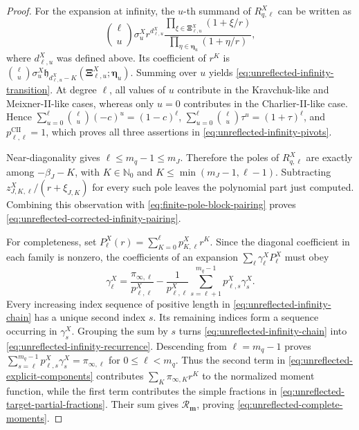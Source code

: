 \documentclass[10pt]{amsart}
\newcommand{\Nzero}{\mathbb N_0}
\newcommand{\mm}{\boldsymbol m}
\theoremstyle{plain}
\theoremstyle{definition}
\theoremstyle{remark}
\begin{document}
\begin{proof}
For the expansion at infinity, the \(u\)-th summand of
\(R_{q,\ell}^X\) can be written as
\[
 \binom\ell u\sigma_u^X
 r^{d_{\ell,u}^X}
 \frac{\prod_{\xi\in\boldsymbol\Xi_{\ell,u}^X}(1+\xi/r)}
      {\prod_{\eta\in\boldsymbol\eta_u}(1+\eta/r)},
\]
where \(d_{\ell,u}^X\) was defined above. Its coefficient of \(r^K\) is
\(\binom\ell u\sigma_u^X
\mathfrak h_{d_{\ell,u}^X-K}
(\boldsymbol\Xi_{\ell,u}^X;\boldsymbol\eta_u)\).
Summing over \(u\) yields
\eqref{eq:unreflected-infinity-transition}.  At degree \(\ell\), all
values of \(u\) contribute in the Kravchuk-like and Meixner-II-like cases, whereas
only \(u=0\) contributes in the Charlier-II-like case. Hence
\(\sum_{u=0}^{\ell}\binom\ell u(-c)^u=(1-c)^\ell\),
\(\sum_{u=0}^{\ell}\binom\ell u\tau^u=(1+\tau)^\ell\), and
\(p_{\ell,\ell}^{\mathrm{CII}}=1\),
which proves all three assertions in
\eqref{eq:unreflected-infinity-pivots}.

Near-diagonality gives \(\ell\le m_q-1\le m_J\).  Therefore the poles
of \(R_{q,\ell}^X\) are exactly among
\(-\beta_J-K\), with
\(K\in\Nzero\) and \(K\le\min(m_J-1,\ell-1)\). Subtracting
\(z_{J,K,\ell}^X/(r+\xi_{J,K})\) for every such pole leaves the
polynomial part just computed.  Combining this observation with
\eqref{eq:finite-pole-block-pairing} proves
\eqref{eq:unreflected-corrected-infinity-pairing}.

For completeness, set
\(P_\ell^X(r)=\sum_{K=0}^{\ell}p_{K,\ell}^Xr^K\).  Since the diagonal
coefficient in each family is nonzero, the coefficients of an expansion
\(\sum_\ell\gamma_\ell^XP_\ell^X\) must obey
\begin{equation}
 \gamma_\ell^X
 =\frac{\pi_{\infty,\ell}}{p_{\ell,\ell}^X}
 -\frac1{p_{\ell,\ell}^X}
  \sum_{s=\ell+1}^{m_q-1}p_{\ell,s}^X\gamma_s^X.
 \label{eq:unreflected-infinity-recurrence}
\end{equation}
Every increasing index sequence of positive length in
\eqref{eq:unreflected-infinity-chain} has a unique second index \(s\).
Its remaining indices form a sequence occurring in \(\gamma_s^X\).
Grouping the sum by \(s\) turns
\eqref{eq:unreflected-infinity-chain} into
\eqref{eq:unreflected-infinity-recurrence}. Descending from
\(\ell=m_q-1\) proves
\(\sum_{s=\ell}^{m_q-1}p_{\ell,s}^X\gamma_s^X
=\pi_{\infty,\ell}\) for \(0\le\ell<m_q\).
Thus the second term in
\eqref{eq:unreflected-explicit-components} contributes
\(\sum_K\pi_{\infty,K}r^K\) to the normalized moment function, while the
first term contributes the simple fractions in
\eqref{eq:unreflected-target-partial-fractions}. Their sum gives
\(\mathcal R_{\mm}\), proving
\eqref{eq:unreflected-complete-moments}.


\end{proof}
\end{document}
